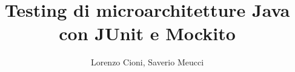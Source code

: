 \documentclass[12pt,a4paper,oneside,italian]{book}
\author{Lorenzo Cioni, Saverio Meucci}
\title{\textbf{Testing di microarchitetture Java con JUnit e Mockito}}
\begin{document}
\frontmatter
\maketitle  	%

\tableofcontents


\mainmatter{






}

\backmatter

\end{document}

